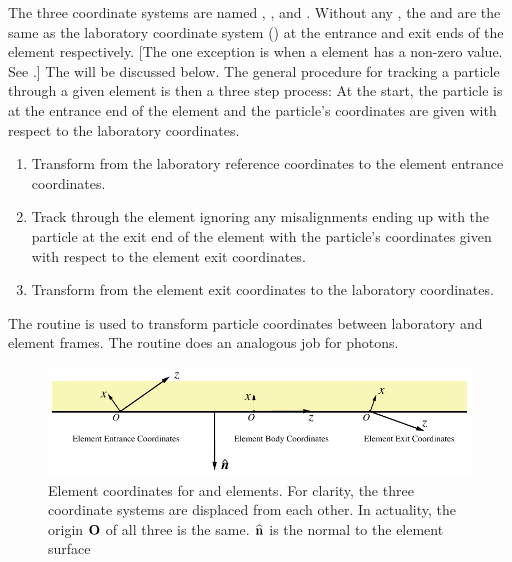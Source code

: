 The three coordinate systems are named , , and . Without any , the  and  are the same
as the laboratory coordinate system () at the entrance and
exit ends of the element respectively. [The one exception is when
a  element has a non-zero  value. See
.] The  will be
discussed below. The general procedure for tracking a particle through
a given element is then a three step process: At the start, the
particle is at the entrance end of the element and the particle's
coordinates are given with respect to the laboratory coordinates.
\begin{enumerate}
\item
Transform from the laboratory reference coordinates to the element
entrance coordinates.
\item
Track through the element ignoring any misalignments ending up with
the particle at the exit end of the element with the particle's
coordinates given with respect to the element exit coordinates.
\item
Transform from the element exit coordinates to the laboratory
coordinates.
\end{enumerate}
The  routine is used to
transform particle coordinates between laboratory and element
frames. The  routine does an
analogous job for photons.

\begin{figure}[tb]
  \centering
  \includegraphics[width=5in]{photon-ele-coords.pdf}
  \caption[Crystal and Mirror Element Coordinates.]
{Element coordinates for  and  elements. For
clarity, the three coordinate systems are displaced from each
other. In actuality, the origin ${\bf O}$ of all three is the same.
${\widehat{\bf n}}$ is the normal to the element surface}
  \label{f:photon.ele.coords}
\end{figure}

